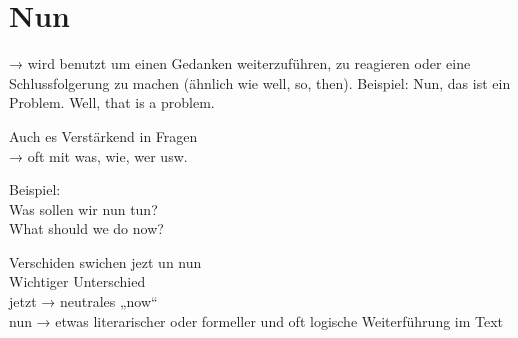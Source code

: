 \documentclass[a4paper]{article}
\title{}
\date{}
\begin{document}
    \maketitle
    
    
    \section{Nun}
        → wird benutzt um einen Gedanken weiterzuführen, zu reagieren oder eine Schlussfolgerung zu machen (ähnlich wie well, so, then).
        Beispiel:
        Nun, das ist ein Problem.
        Well, that is a problem.
        
        Auch es Verstärkend in Fragen\\
        → oft mit was, wie, wer usw.
        
        Beispiel:\\
        Was sollen wir nun tun?\\
        What should we do now?
        
        Verschiden swichen jezt un nun\\
        Wichtiger Unterschied\\
        jetzt → neutrales „now“\\
        nun → etwas literarischer oder formeller und oft logische Weiterführung im Text
\end{document}
